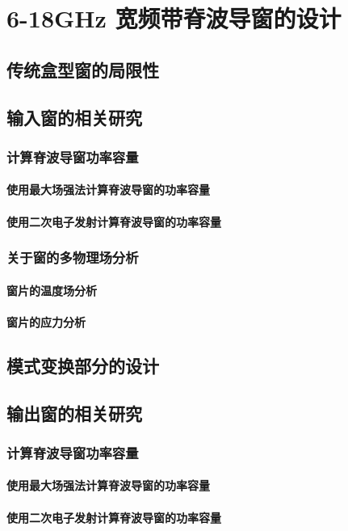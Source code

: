 \documentclass[master]{thesis-uestc}
\begin{document}
\chapter{6-18GHz 宽频带脊波导窗的设计}
\section{传统盒型窗的局限性}
\section{输入窗的相关研究}
\subsection{计算脊波导窗功率容量}
\subsubsection{使用最大场强法计算脊波导窗的功率容量}
\subsubsection{使用二次电子发射计算脊波导窗的功率容量}
\subsection{关于窗的多物理场分析}
\subsubsection{窗片的温度场分析}
\subsubsection{窗片的应力分析}
\section{模式变换部分的设计}
\section{输出窗的相关研究}

\subsection{计算脊波导窗功率容量}
\subsubsection{使用最大场强法计算脊波导窗的功率容量}
\subsubsection{使用二次电子发射计算脊波导窗的功率容量}
\end{document}
